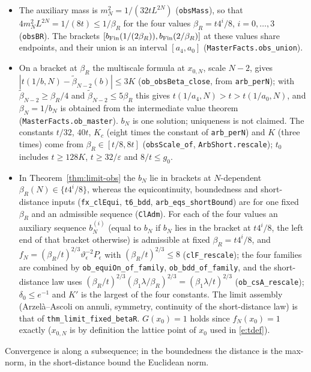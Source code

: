 \documentclass[11pt]{amsart}
\theoremstyle{definition}
\theoremstyle{remark}
\numberwithin{equation}{section}
\begin{document}
\begin{itemize}
\item The auxiliary mass is $m_N^2=1/(32tL^{2N})$ (\texttt{obsMass}), so that $4m_N^2L^{2N}=1/(8t)\le1/\beta_R$ for the
  four values $\beta_R=t4^i/8$, $i=0,\dots,3$ (\texttt{obsBR}). The brackets $[b_{\rm Fin}(1/(2\beta_R)),b_{\rm Fin}(2/\beta_R)]$
  at these values share endpoints, and their union is an interval $[a_4,a_0]$ (\texttt{MasterFacts.obs\_union}).
\item On a bracket at $\beta_R$ the multiscale formula at $x_{0,N}$, scale $N-2$, gives
  $|t(1/b,N)-\tilde\beta_{N-2}(b)|\le3K$ (\texttt{ob\_obsBeta\_close}, from \texttt{arb\_perN}); with $\tilde\beta_{N-2}\ge\beta_R/4$ and
  $\tilde\beta_{N-2}\le5\beta_R$ this gives $t(1/a_4,N)>t>t(1/a_0,N)$, and $\beta_N=1/b_N$ is obtained from the intermediate value
  theorem (\texttt{MasterFacts.ob\_master}). $b_N$ is one solution; uniqueness is not claimed. The constants $t/32$, $40t$,
  $K_c$ (eight times the constant of \texttt{arb\_perN}) and $K$ (three times) come from $\beta_R\in[t/8,8t]$
  (\texttt{obsScale\_of}, \texttt{ArbShort.rescale}); $t_0$ includes $t\ge128K$, $t\ge32/\varepsilon$ and $8/t\le g_0$.
\item In Theorem~\ref{thm:limit-obs} the $b_N$ lie in brackets at $N$-dependent $\beta_R(N)\in\{t4^i/8\}$, whereas the
  equicontinuity, boundedness and short-distance inputs (\texttt{fx\_clEqui}, \texttt{t6\_bdd}, \texttt{arb\_eqs\_shortBound}) are for
  one fixed $\beta_R$ and an admissible sequence (\texttt{ClAdm}). For each of the four values an auxiliary sequence
  $b^{(i)}_N$ (equal to $b_N$ if $b_N$ lies in the bracket at $t4^i/8$, the left end of that bracket otherwise) is
  admissible at fixed $\beta_R=t4^i/8$, and $f_N=(\beta_R/t)^{2/3}\vartheta_\epsilon^{-2}P_\epsilon$ with
  $(\beta_R/t)^{2/3}\le8$ (\texttt{clF\_rescale}); the four families are combined by \texttt{ob\_equiOn\_of\_family},
  \texttt{ob\_bdd\_of\_family}, and the short-distance law uses $(\beta_R/t)^{2/3}(\beta_1\lambda/\beta_R)^{2/3}=(\beta_1\lambda/t)^{2/3}$
  (\texttt{ob\_csA\_rescale}); $\delta_0\le e^{-1}$ and $K'$ is the largest of the four constants.
  The limit assembly (Arzel\`a--Ascoli on annuli, symmetry, continuity of the short-distance law) is that of
  \texttt{thm\_limit\_fixed\_betaR}. $G(x_0)=1$ holds since $f_N(x_0)=1$ exactly ($x_{0,N}$ is by definition the lattice
  point of $x_0$ used in \eqref{e:tdef}).
\end{itemize}
Convergence is along a subsequence; in the boundedness the distance is the max-norm, in the short-distance bound the
Euclidean norm.
\end{document}
